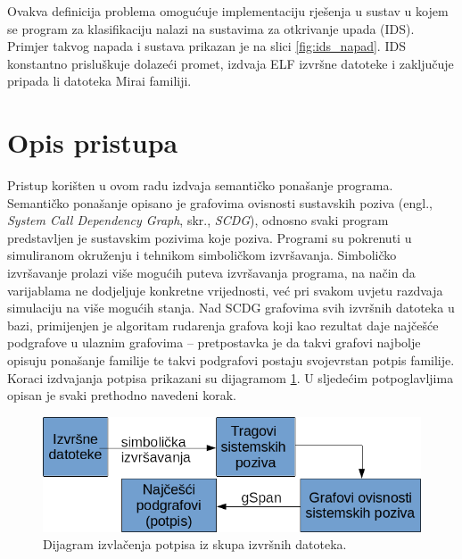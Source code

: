 Ovakva definicija problema omogućuje implementaciju rješenja u sustav u kojem
se program za klasifikaciju nalazi na sustavima za otkrivanje upada (IDS).
Primjer takvog napada i sustava prikazan je na slici \ref{fig:ids_napad}. IDS 
konstantno prisluškuje dolazeći promet, izdvaja ELF izvršne datoteke i 
zaključuje pripada li datoteka Mirai familiji.



\section{Opis pristupa} %


 Pristup korišten u ovom radu izdvaja semantičko ponašanje programa. Semantičko 
 ponašanje opisano je grafovima ovisnosti sustavskih poziva (engl., 
 \textit{System Call Dependency Graph}, skr., \textit{SCDG}), odnosno svaki 
 program predstavljen je sustavskim pozivima koje poziva. Programi su pokrenuti 
 u simuliranom okruženju i tehnikom simboličkom izvršavanja. Simboličko 
 izvršavanje prolazi više mogućih puteva izvršavanja programa, na način da 
 varijablama ne dodjeljuje konkretne vrijednosti, već pri svakom uvjetu 
 razdvaja simulaciju na više mogućih stanja. Nad SCDG grafovima svih izvršnih
 datoteka u bazi, primijenjen je algoritam rudarenja grafova koji kao rezultat 
 daje najčešće podgrafove u ulaznim grafovima -- pretpostavka je da takvi 
 grafovi najbolje opisuju ponašanje familije te takvi podgrafovi postaju
 svojevrstan potpis familije. Koraci izdvajanja potpisa
 prikazani su dijagramom \ref{fig:mining}. U sljedećim potpoglavljima opisan 
 je svaki prethodno navedeni korak.


 \begin{figure}[htb]
    \centering
    \includegraphics[scale=0.5]{images/mining.png}
    \caption{Dijagram izvlačenja potpisa iz skupa izvršnih datoteka.}
    \label{fig:mining}
\end{figure}

